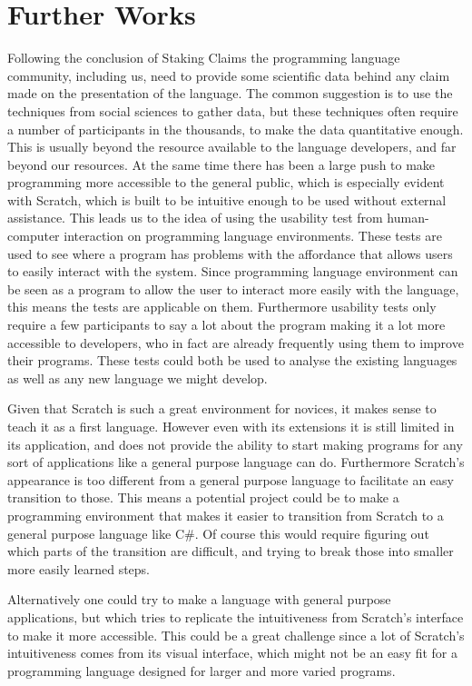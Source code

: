 \chapter{Further Works}
\label{chap:further_works}
Following the conclusion of Staking Claims the programming language community, including us, need to provide some scientific data behind any claim made on the presentation of the language.
The common suggestion is to use the techniques from social sciences to gather data, but these techniques often require a number of participants in the thousands, to make the data quantitative enough.
This is usually beyond the resource available to the language developers, and far beyond our resources.
At the same time there has been a large push to make programming more accessible to the general public, which is especially evident with Scratch, which is built to be intuitive enough to be used without external assistance.
This leads us to the idea of using the usability test from human-computer interaction on programming language environments.
These tests are used to see where a program has problems with the affordance that allows users to easily interact with the system.
Since programming language environment can be seen as a program to allow the user to interact more easily with the language, this means the tests are applicable on them.
Furthermore usability tests only require a few participants to say a lot about the program making it a lot more accessible to developers, who in fact are already frequently using them to improve their programs.
These tests could both be used to analyse the existing languages as well as any new language we might develop.

Given that Scratch is such a great environment for novices, it makes sense to teach it as a first language.
However even with its extensions it is still limited in its application, and does not provide the ability to start making programs for any sort of applications like a general purpose language can do.
Furthermore Scratch's appearance is too different from a general purpose language to facilitate an easy transition to those.
This means a potential project could be to make a programming environment that makes it easier to transition from Scratch to a general purpose language like C\#.
Of course this would require figuring out which parts of the transition are difficult, and trying to break those into smaller more easily learned steps.

Alternatively one could try to make a language with general purpose applications, but which tries to replicate the intuitiveness from Scratch's interface to make it more accessible.
This could be a great challenge since a lot of Scratch's intuitiveness comes from its visual interface, which might not be an easy fit for a programming language designed for larger and more varied programs.

